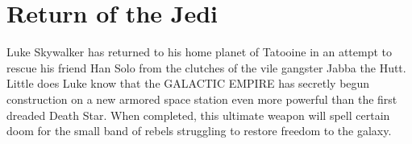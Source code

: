 \chapter{Return of the Jedi}
Luke Skywalker has returned to his home planet of Tatooine 
in an attempt to rescue his friend Han Solo from the 
clutches of the vile gangster Jabba the Hutt.  Little does 
Luke know that the GALACTIC EMPIRE has secretly begun 
construction on a new armored space station even more 
powerful than the first dreaded Death Star.  When completed, 
this ultimate weapon will spell certain doom for the small 
band of rebels struggling to restore freedom to the galaxy.

\lipsum[1-10]
\cite{EICHTEN_1980}

\lqcd
